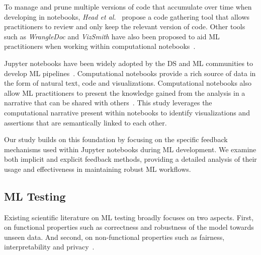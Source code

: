 To manage and prune multiple versions of code that accumulate over time when developing in notebooks, \emph{Head et al.}~\cite{head2019managing} propose a code gathering tool that allows practitioners to review and only keep the relevant version of code. Other tools such as \textit{WrangleDoc} and \textit{VizSmith} have also been proposed to aid ML practitioners when working within computational notebooks~\cite{yang2021subtle,bavishi2021vizsmith}.

Jupyter notebooks have been widely adopted by the DS and ML communities to develop ML pipelines~\cite{wang2020assessing,pimentel2019large-scale,quaranta2021kgtorrent}. Computational notebooks provide a rich source of data in the form of natural text, code and visualizations. Computational notebooks also allow ML practitioners to present the knowledge gained from the analysis in a narrative that can be shared with others~\cite{rule2018exploration}. This study leverages the computational narrative present within notebooks to identify visualizations and assertions that are semantically linked to each other.

Our study builds on this foundation by focusing on the specific feedback mechanisms used within Jupyter notebooks during ML development. We examine both implicit and explicit feedback methods, providing a detailed analysis of their usage and effectiveness in maintaining robust ML workflows.

\subsection{ML Testing}\label{sec:ml-testing}

Existing scientific literature on ML testing broadly focuses on two aspects. First, on functional properties such as correctness and robustness of the model towards unseen data. And second, on non-functional properties such as fairness, interpretability and privacy~\cite{zhang2022machine,mehrabi2021survey,chen2022fairness}.

